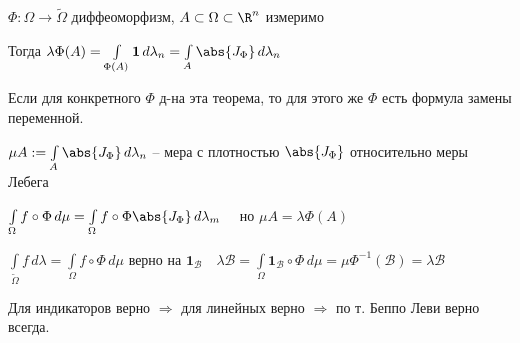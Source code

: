 
\begin{theorem}\thmslashn
	
	$\Phi: \Omega \to \tilde{\Omega}$ диффеоморфизм, $A \subset \Omega \subset \R^n$ измеримо
	
	Тогда $\lambda \Phi(A) = \int\limits_{\Phi(A)} \mathbf{1}\,d\lambda_n = \int\limits_{A} \abs{J_\Phi}\,d\lambda_n$
\end{theorem}

\begin{remark}\thmslashn
	
	Если для конкретного $\Phi$ д-на эта теорема, то для этого же $\Phi$ есть формула замены переменной.
	
	$\mu A := \int\limits_{A} \abs{J_\Phi} \,d\lambda_n$ -- мера с плотностью $\abs{J_\Phi}$ относительно меры Лебега 
	
	$\int\limits_\Omega f \circ \Phi \, d\mu = \int\limits_\Omega f \circ \Phi \abs{J_\Phi} \, d\lambda_m \quad$ но $\mu A = \lambda \Phi (A)$
	
	$\int\limits_{\tilde{\Omega}} f\,d\lambda = \int\limits_\Omega f \circ \Phi \, d\mu$  верно на $\mathbf{1}_\mathcal{B}\quad \lambda \mathcal{B} = \int\limits_\Omega \mathbf{1}_\mathcal{B} \circ \Phi \, d\mu = \mu \Phi^{-1}(\mathcal{B}) = \lambda \mathcal{B}$ 
	
	Для индикаторов верно $\Rightarrow$ для линейных верно $\Rightarrow$ по т. Беппо Леви верно всегда. 
	
\end{remark}

